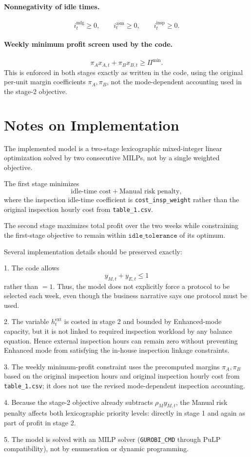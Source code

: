 \paragraph{Nonnegativity of idle times.}
\[
i^{\mathrm{mfg}}_t\ge 0,\qquad i^{\mathrm{asm}}_t\ge 0,\qquad i^{\mathrm{insp}}_t\ge 0.
\]

\paragraph{Weekly minimum profit screen used by the code.}
\[
\pi_A x_{A,t}+\pi_B x_{B,t}\ge \Pi^{\min}.
\]
This is enforced in both stages exactly as written in the code, using the original per-unit margin coefficients \(\pi_A,\pi_B\), not the mode-dependent accounting used in the stage-2 objective.

\section*{Notes on Implementation}

The implemented model is a two-stage lexicographic mixed-integer linear optimization solved by two consecutive MILPs, not by a single weighted objective.

The first stage minimizes
\[
\text{idle-time cost} + \text{Manual risk penalty},
\]
where the inspection idle-time coefficient is \texttt{cost\_insp\_weight} rather than the original inspection hourly cost from \texttt{table\_1.csv}.

The second stage maximizes total profit over the two weeks while constraining the first-stage objective to remain within \(\texttt{idle\_tolerance}\) of its optimum.

Several implementation details should be preserved exactly:

1. The code allows
\[
y_{M,t}+y_{E,t}\le 1
\]
rather than \(=1\). Thus, the model does not explicitly force a protocol to be selected each week, even though the business narrative says one protocol must be used.

2. The variable \(h^{\mathrm{ext}}_t\) is costed in stage 2 and bounded by Enhanced-mode capacity, but it is not linked to required inspection workload by any balance equation. Hence external inspection hours can remain zero without preventing Enhanced mode from satisfying the in-house inspection linkage constraints.

3. The weekly minimum-profit constraint uses the precomputed margins \(\pi_A,\pi_B\) based on the original inspection hours and original inspection hourly cost from \texttt{table\_1.csv}; it does not use the revised mode-dependent inspection accounting.

4. Because the stage-2 objective already subtracts \(\rho_M y_{M,t}\), the Manual risk penalty affects both lexicographic priority levels: directly in stage 1 and again as part of profit in stage 2.

5. The model is solved with an MILP solver (\texttt{GUROBI\_CMD} through PuLP compatibility), not by enumeration or dynamic programming.
